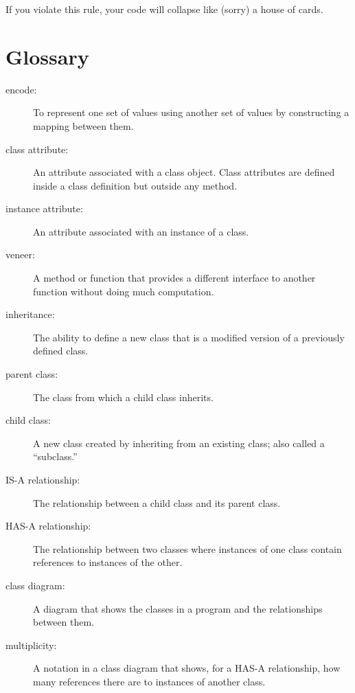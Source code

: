 \documentclass[10pt]{book}
\begin{document}
If you violate this rule, your code will collapse like (sorry)
a house of cards.


\section{Glossary}

\begin{description}

\item[encode:]  To represent one set of values using another
set of values by constructing a mapping between them.

\item[class attribute:] An attribute associated with a class
object.  Class attributes are defined inside
a class definition but outside any method.

\item[instance attribute:] An attribute associated with an
instance of a class.

\item[veneer:] A method or function that provides a different
interface to another function without doing much computation.

\item[inheritance:] The ability to define a new class that is a
modified version of a previously defined class.

\item[parent class:] The class from which a child class inherits.

\item[child class:] A new class created by inheriting from an
existing class; also called a ``subclass.''

\item[IS-A relationship:] The relationship between a child class
and its parent class.

\item[HAS-A relationship:] The relationship between two classes
where instances of one class contain references to instances of
the other.

\item[class diagram:] A diagram that shows the classes in a program
and the relationships between them.

\item[multiplicity:] A notation in a class diagram that shows, for
a HAS-A relationship, how many references there are to instances
of another class.

\end{description}
\end{document}
